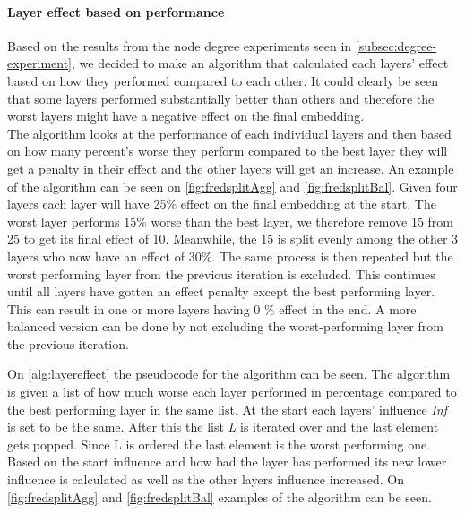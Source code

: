 \paragraph{Layer effect based on performance} \label{fredsplit}
Based on the results from the node degree experiments seen in \autoref{subsec:degree-experiment}, we decided to make an algorithm that calculated each layers' effect based on how they performed compared to each other.
It could clearly be seen that some layers performed substantially better than others and therefore the worst layers might have a negative effect on the final embedding.
\\
The algorithm looks at the performance of each individual layers and then based on how many percent's worse they perform compared to the best layer they will get a penalty in their effect and the other layers will get an increase.
An example of the algorithm can be seen on \autoref{fig:fredsplitAgg} and \autoref{fig:fredsplitBal}.
Given four layers each layer will have 25\% effect on the final embedding at the start.
The worst layer performs 15\% worse than the best layer, we therefore remove 15 from 25 to get its final effect of 10.
Meanwhile, the 15 is split evenly among the other 3 layers who now have an effect of 30\%.
The same process is then repeated but the worst performing layer from the previous iteration is excluded.
This continues until all layers have gotten an effect penalty except the best performing layer.
This can result in one or more layers having 0 \% effect in the end.
A more balanced version can be done by not excluding the worst-performing layer from the previous iteration.

On \autoref{alg:layereffect} the pseudocode for the algorithm can be seen.
The algorithm is given a list of how much worse each layer performed in percentage compared to the best performing layer in the same list.
At the start each layers' influence \textit{Inf} is set to be the same.
After this the list \textit{L} is iterated over and the last element gets popped.
Since L is ordered the last element is the worst performing one.
Based on the start influence and how bad the layer has performed its new lower influence is calculated as well as the other layers influence increased.
On \autoref{fig:fredsplitAgg} and \autoref{fig:fredsplitBal} examples of the algorithm can be seen.


